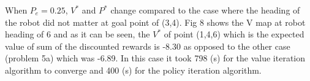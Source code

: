 \documentclass{article}
\begin{document}
	\newpage
	When $P_{e} = 0.25$, $V^*$ and $P^*$ change compared to the case where the heading of the robot did not matter at goal point of (3,4). Fig 8 shows the V map at robot heading of 6 and as it can be seen, the $V^*$ of point (1,4,6) which is the expected value of sum of the discounted rewards is -8.30 as opposed to the other case (problem 5a) which was -6.89. In this case it took 798 (s) for the value iteration algorithm to converge and 400 (s) for the policy iteration algorithm.
	
		\begin{figure}[h!]
		\centering
		\begin{minipage}{0.5\textwidth}%
		\end{minipage}
		\qquad
		\begin{minipage}{0.4\textwidth}%
\end{minipage}
\end{figure}
\end{document}
